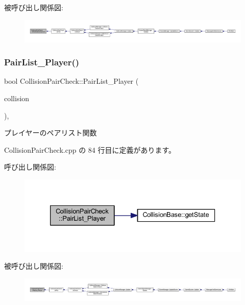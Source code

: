 被呼び出し関係図\+:
\nopagebreak
\begin{figure}[H]
\begin{center}
\leavevmode
\includegraphics[width=350pt]{class_collision_pair_check_a97c459f98bce9f88d9f506423395c40c_icgraph}
\end{center}
\end{figure}
\mbox{\label{class_collision_pair_check_a9f1819e873a51fcf50a7dbbf5f9d8690}} 
\subsubsection{\texorpdfstring{Pair\+List\+\_\+\+Player()}{PairList\_Player()}}
{\footnotesize\ttfamily bool Collision\+Pair\+Check\+::\+Pair\+List\+\_\+\+Player (\begin{DoxyParamCaption}\item[{\mbox{\hyperlink{class_collision_base}{Collision\+Base}} $\ast$}]{collision }\end{DoxyParamCaption})\hspace{0.3cm}{\ttfamily [static]}, {\ttfamily [private]}}



プレイヤーのペアリスト関数 



 Collision\+Pair\+Check.\+cpp の 84 行目に定義があります。

呼び出し関係図\+:\nopagebreak
\begin{figure}[H]
\begin{center}
\leavevmode
\includegraphics[width=333pt]{class_collision_pair_check_a9f1819e873a51fcf50a7dbbf5f9d8690_cgraph}
\end{center}
\end{figure}
被呼び出し関係図\+:
\nopagebreak
\begin{figure}[H]
\begin{center}
\leavevmode
\includegraphics[width=350pt]{class_collision_pair_check_a9f1819e873a51fcf50a7dbbf5f9d8690_icgraph}
\end{center}
\end{figure}


